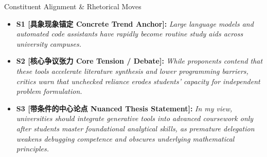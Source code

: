 \begin{TipBox}{Constituent Alignment \& Rhetorical Moves}
\begin{itemize}[leftmargin=1.5em]
  \item \textbf{S1 [具象现象锚定 Concrete Trend Anchor]:} \textit{Large language models and automated code assistants have rapidly become routine study aids across university campuses.}\par{}
  \item \textbf{S2 [核心争议张力 Core Tension / Debate]:} \textit{While proponents contend that these tools accelerate literature synthesis and lower programming barriers, critics warn that unchecked reliance erodes students' capacity for independent problem formulation.}\par{}
  \item \textbf{S3 [带条件的中心论点 Nuanced Thesis Statement]:} \textit{In my view, universities should integrate generative tools into advanced coursework only after students master foundational analytical skills, as premature delegation weakens debugging competence and obscures underlying mathematical principles.}\par{}
\end{itemize}
\end{TipBox}
\bigskip
